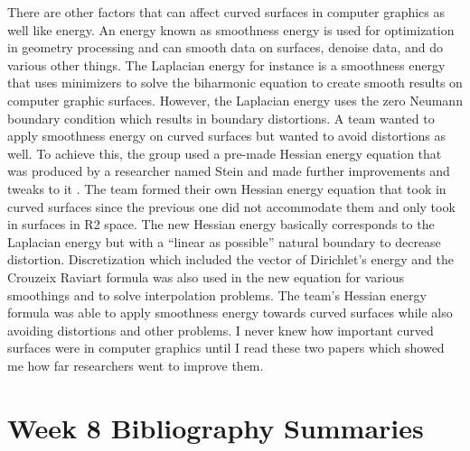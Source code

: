 \documentclass{article}
\begin{document}
There are other factors that can affect curved surfaces in computer graphics as well like energy. An energy known as smoothness energy is used for optimization in geometry processing and can smooth data on surfaces, denoise data, and do various other things. The Laplacian energy for instance is a smoothness energy that uses minimizers to solve the biharmonic equation to create smooth results on computer graphic surfaces. However, the Laplacian energy uses the zero Neumann boundary condition which results in boundary distortions. A team wanted to apply smoothness energy on curved surfaces but wanted to avoid distortions as well. To achieve this, the group used a pre-made Hessian energy equation that was produced by a researcher named Stein and made further improvements and tweaks to it \cite{10.1145/3377406}. The team formed their own Hessian energy equation that took in curved surfaces since the previous one did not accommodate them and only took in surfaces in R2 space. The new Hessian energy basically corresponds to the Laplacian energy but with a “linear as possible” natural boundary to decrease distortion. Discretization which included the vector of Dirichlet’s energy and the Crouzeix Raviart formula was also used in the new equation for various smoothings and to solve interpolation problems. The team’s Hessian energy formula was able to apply smoothness energy towards curved surfaces while also avoiding distortions and other problems. I never knew how important curved surfaces were in computer graphics until I read these two papers which showed me how far researchers went to improve them. 
	
\section{Week 8 Bibliography Summaries} 
\end{document}
